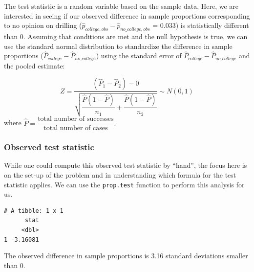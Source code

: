 \documentclass[12pt, krantz2,]{krantz}
\makeatletter
\newenvironment{Shaded}{\begin{snugshade}}{\end{snugshade}}
\newcommand{\DataTypeTok}[1]{\textcolor[rgb]{0.27,0.27,0.27}{#1}}
\newcommand{\KeywordTok}[1]{\textcolor[rgb]{0.27,0.27,0.27}{\textbf{#1}}}
\newcommand{\NormalTok}[1]{#1}
\newcommand{\OperatorTok}[1]{\textcolor[rgb]{0.43,0.43,0.43}{\textbf{#1}}}
\newcommand{\StringTok}[1]{\textcolor[rgb]{0.5,0.5,0.5}{#1}}
\newenvironment{kframe}{%
\medskip{}
\setlength{\fboxsep}{.8em}
 \def\at@end@of@kframe{}%
 \ifinner\ifhmode%
  \def\at@end@of@kframe{\end{minipage}}%
  \begin{minipage}{\columnwidth}%
 \fi\fi%
 \def\FrameCommand##1{\hskip\@totalleftmargin \hskip-\fboxsep
 \colorbox{shadecolor}{##1}\hskip-\fboxsep
     \hskip-\linewidth \hskip-\@totalleftmargin \hskip\columnwidth}%
 \MakeFramed {\advance\hsize-\width
   \@totalleftmargin\z@ \linewidth\hsize
   \@setminipage}}%
 {\par\unskip\endMakeFramed%
 \at@end@of@kframe}
\renewenvironment{Shaded}{\begin{kframe}}{\end{kframe}}
\makeatother
\begin{document}
The test statistic is a random variable based on the sample data. Here, we are interested in seeing if our observed difference in sample proportions corresponding to no opinion on drilling (\(\hat{p}_{college, obs} - \hat{p}_{no\_college, obs}\) = 0.033) is statistically different than 0. Assuming that conditions are met and the null hypothesis is true, we can use the standard normal distribution to standardize the difference in sample proportions (\(\hat{P}_{college} - \hat{P}_{no\_college}\)) using the standard error of \(\hat{P}_{college} - \hat{P}_{no\_college}\) and the pooled estimate:

\[ Z =\dfrac{ (\hat{P}_1 - \hat{P}_2) - 0}{\sqrt{\dfrac{\hat{P}(1 - \hat{P})}{n_1} + \dfrac{\hat{P}(1 - \hat{P})}{n_2} }} \sim N(0, 1) \] where \(\hat{P} = \dfrac{\text{total number of successes} }{ \text{total number of cases}}.\)

\hypertarget{observed-test-statistic-2}{%
\subsubsection*{Observed test statistic}\label{observed-test-statistic-2}}


While one could compute this observed test statistic by ``hand'', the focus here is on the set-up of the problem and in understanding which formula for the test statistic applies. We can use the \texttt{prop.test} function to perform this analysis for us.

\begin{Shaded}
\end{Shaded}

\begin{verbatim}
# A tibble: 1 x 1
      stat
     <dbl>
1 -3.16081
\end{verbatim}

The observed difference in sample proportions is 3.16 standard deviations smaller than 0.
\end{document}
